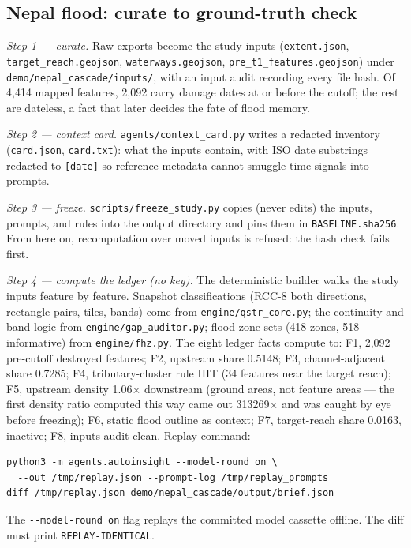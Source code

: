 \documentclass[11pt]{article}
\begin{document}
\subsection{Nepal flood: curate to ground-truth check}

\emph{Step 1 --- curate.} Raw exports become the study inputs
(\verb|extent.json|, \verb|target_reach.geojson|, \verb|waterways.geojson|,
\verb|pre_t1_features.geojson|) under \verb|demo/nepal_cascade/inputs/|,
with an input audit recording every file hash. Of 4,414 mapped features,
2,092 carry damage dates at or before the cutoff; the rest are dateless, a
fact that later decides the fate of flood memory.

\emph{Step 2 --- context card.} \verb|agents/context_card.py| writes a
redacted inventory (\verb|card.json|, \verb|card.txt|): what the inputs
contain, with ISO date substrings redacted to \verb|[date]| so reference
metadata cannot smuggle time signals into prompts.

\emph{Step 3 --- freeze.} \verb|scripts/freeze_study.py| copies (never edits)
the inputs, prompts, and rules into the output directory and pins them in
\verb|BASELINE.sha256|. From here on, recomputation over moved inputs is
refused: the hash check fails first.

\emph{Step 4 --- compute the ledger (no key).} The deterministic builder
walks the study inputs feature by feature. Snapshot classifications (RCC-8
both directions, rectangle pairs, tiles, bands) come from
\verb|engine/qstr_core.py|; the continuity and band logic from
\verb|engine/gap_auditor.py|; flood-zone sets (418 zones, 518 informative)
from \verb|engine/fhz.py|. The eight ledger facts compute to: F1, 2,092
pre-cutoff destroyed features; F2, upstream share 0.5148; F3,
channel-adjacent share 0.7285; F4, tributary-cluster rule HIT (34 features
near the target reach); F5, upstream density 1.06$\times$ downstream (ground
areas, not feature areas --- the first density ratio computed this way came
out 313269$\times$ and was caught by eye before freezing); F6, static flood
outline as context; F7, target-reach share 0.0163, inactive; F8, inputs-audit
clean. Replay command:
{\footnotesize
\begin{verbatim}
python3 -m agents.autoinsight --model-round on \
  --out /tmp/replay.json --prompt-log /tmp/replay_prompts
diff /tmp/replay.json demo/nepal_cascade/output/brief.json
\end{verbatim}
}
The \verb|--model-round on| flag replays the committed model cassette
offline. The diff must print \verb|REPLAY-IDENTICAL|.
\end{document}
